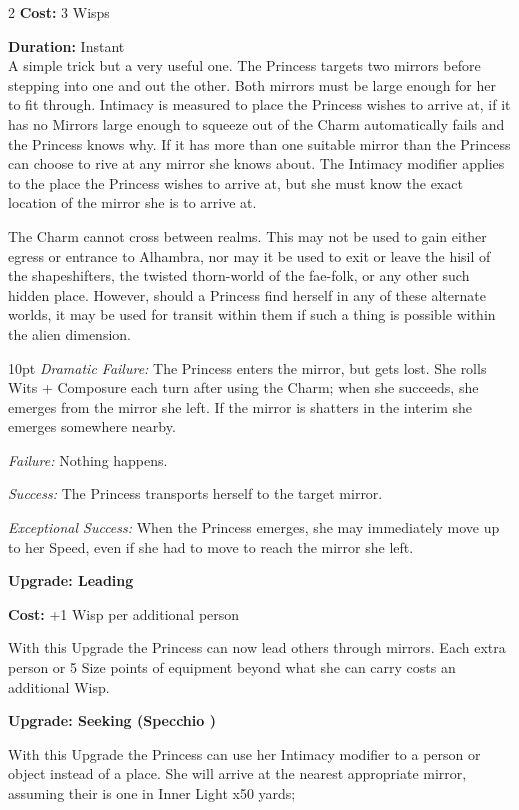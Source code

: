 \begin{multicols}{2}
\noindent \textbf{Cost:} 3 Wisps

\noindent \textbf{Duration:} Instant \\

A simple trick but a very useful one. The Princess targets two mirrors before stepping into one and out the other. Both mirrors must be large enough for her to fit through. Intimacy is measured to place the Princess wishes to arrive at, if it has no Mirrors large enough to squeeze out of the Charm automatically fails and the Princess knows why. If it has more than one suitable mirror than the Princess can choose to rive at any mirror she knows about. The Intimacy modifier applies to the place the Princess wishes to arrive at, but she must know the exact location of the mirror she is to arrive at. 

The Charm cannot cross between realms. This may not be used to gain either egress or entrance to Alhambra, nor may it be used to exit or leave the hisil of the shapeshifters, the twisted thorn-world of the fae-folk, or any other such hidden place. However, should a Princess find herself in any of these alternate worlds, it may be used for transit within them if such a thing is possible within the alien dimension.

\begin{myindentpar}{10pt}    \emph{Dramatic Failure:} The Princess enters the mirror, but gets lost. She rolls Wits + Composure each turn after using the Charm; when she succeeds, she emerges from the mirror she left. If the mirror is shatters in the interim she emerges somewhere nearby. 
    
	\emph{Failure:} Nothing happens.
    
	\emph{Success:} The Princess transports herself to the target mirror.
    
	\emph{Exceptional Success:} When the Princess emerges, she may immediately move up to her Speed, even if she had to move to reach the mirror she left.

\textbf{Upgrade: Leading}

\noindent \textbf{Cost:} +1 Wisp per additional person

With this Upgrade the Princess can now lead others through mirrors. Each extra person or 5 Size points of equipment beyond what she can carry costs an additional Wisp.

\textbf{Upgrade: Seeking (Specchio \textbullet\textbullet\textbullet)}

With this Upgrade the Princess can use her Intimacy modifier to a person or object instead of a place. She will arrive at the nearest appropriate mirror, assuming their is one in Inner Light x50 yards;  


\end{myindentpar}
\end{multicols}
